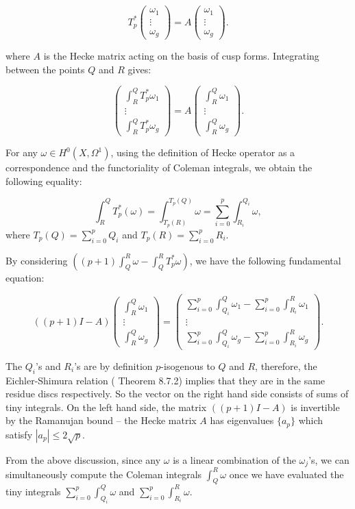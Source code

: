 \[T_p^*\begin{pmatrix} \omega_1 \\\vdots \\ \omega_g \end{pmatrix}  = A\begin{pmatrix} \omega_1 \\\vdots \\ \omega_g \end{pmatrix}.\]

where $A$ is the Hecke matrix acting on the basis of cusp forms. Integrating between the points $Q$ and $R$ gives:

\[\begin{pmatrix} \int^Q_RT_p^*\omega_1 \\\vdots \\ \int^Q_RT_p^*\omega_g \end{pmatrix}  = A\begin{pmatrix} \int^Q_R\omega_1 \\\vdots \\ \int^Q_R\omega_g \end{pmatrix}.\]


For any $\omega \in H^0(X,\Omega^1)$, using the definition of Hecke operator as a correspondence and the functoriality of Coleman integrals, we obtain the following equality:

\[\int^Q_R T_p^*(\omega) = \int^{T_p(Q)}_{T_p(R)} \omega = \sum_{i=0}^{p} \int^{Q_i}_{R_i} \omega,\] where $T_p(Q) = \sum_{i=0}^p Q_i$ and  $T_p(R) = \sum_{i=0}^p R_i$.

By considering $((p+1)\int_{Q}^R \omega - \int_Q^R T_p^* \omega)$, we have the following fundamental equation:

\begin{equation}\label{eq:fundamental-eqn}
   ((p+1)I-A)\begin{pmatrix} \int^Q_R\omega_1 \\\vdots \\ \int^Q_R\omega_g \end{pmatrix} =  \begin{pmatrix} \sum_{i=0}^{p}\int^Q_{Q_i} \omega_1 - \sum_{i=0}^{p}\int^R_{R_i} \omega_1 \\\vdots \\ \sum_{i=0}^{p}\int^Q_{Q_i} \omega_g - \sum_{i=0}^{p}\int^R_{R_i} \omega_g \end{pmatrix}.
\end{equation}

 The $Q_i$'s and $R_i$'s are by definition $p$-isogenous to $Q$ and $R$, therefore, the Eichler-Shimura relation (\cite{Shurman} Theorem 8.7.2) implies that they are in the same residue discs respectively. So the vector on the right hand side consists of sums of tiny integrals. On the left hand side, the matrix $((p+1)I - A)$ is invertible by the Ramanujan bound -- the Hecke matrix $A$ has eigenvalues $\{a_p\}$ which satisfy $|a_p| \leq 2 \sqrt{p}$.

From the above discussion, since any $\omega$ is a linear combination of the $\omega_j$'s, we can simultaneously compute the Coleman integrals $\int_Q^R \omega$ once we have evaluated the tiny integrals $\sum_{i=0}^p \int_{Q_i}^Q \omega$ and $\sum_{i=0}^p \int_{R_i}^R \omega$.